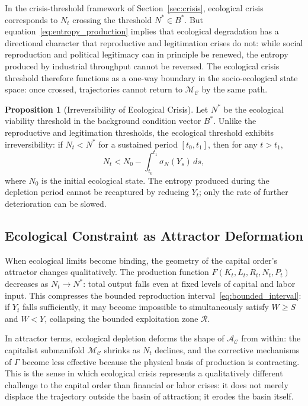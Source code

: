 \documentclass[12pt,a4paper]{article}
\theoremstyle{definition}
\newtheorem{proposition}{Proposition}[section]
\theoremstyle{remark}
\begin{document}
In the crisis-threshold framework of Section~\ref{sec:crisis}, ecological crisis corresponds to $N_t$ crossing the threshold $N^* \in B^*$. But equation~\eqref{eq:entropy_production} implies that ecological degradation has a directional character that reproductive and legitimation crises do not: while social reproduction and political legitimacy can in principle be renewed, the entropy produced by industrial throughput cannot be reversed. The ecological crisis threshold therefore functions as a one-way boundary in the socio-ecological state space: once crossed, trajectories cannot return to $\mathcal{M}_\mathcal{C}$ by the same path.

\begin{proposition}[Irreversibility of Ecological Crisis]
Let $N^*$ be the ecological viability threshold in the background condition vector $B^*$. Unlike the reproductive and legitimation thresholds, the ecological threshold exhibits irreversibility: if $N_t < N^*$ for a sustained period $[t_0, t_1]$, then for any $t > t_1$,
\begin{equation}
  N_t < N_0 - \int_{t_0}^{t_1} \sigma_N(Y_s)\,ds,
\end{equation}
where $N_0$ is the initial ecological state. The entropy produced during the depletion period cannot be recaptured by reducing $Y_t$; only the rate of further deterioration can be slowed.
\end{proposition}

\subsection{Ecological Constraint as Attractor Deformation}

When ecological limits become binding, the geometry of the capital order's attractor changes qualitatively. The production function $F(K_t, L_t, R_t, N_t, P_t)$ decreases as $N_t \to N^*$: total output falls even at fixed levels of capital and labor input. This compresses the bounded reproduction interval~\eqref{eq:bounded_interval}: if $Y_t$ falls sufficiently, it may become impossible to simultaneously satisfy $W \geq S$ and $W < Y$, collapsing the bounded exploitation zone $\mathcal{R}$.

In attractor terms, ecological depletion deforms the shape of $\mathcal{A}_\mathcal{C}$ from within: the capitalist submanifold $\mathcal{M}_\mathcal{C}$ shrinks as $N_t$ declines, and the corrective mechanisms of $\Gamma$ become less effective because the physical basis of production is contracting. This is the sense in which ecological crisis represents a qualitatively different challenge to the capital order than financial or labor crises: it does not merely displace the trajectory outside the basin of attraction; it erodes the basin itself.
\end{document}

